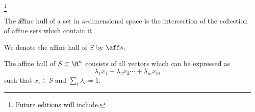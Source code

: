 
\footnote{Future editions will include.}


The \t{affine hull} of a set in $n$-dimensional space is the intersection of the collection of affine sets which contain it.


We denote the affine hull of $S$ by $\aff s$.

\begin{prop}
  The affine hull of $S \subset \R^n$ consists of all vectors which can be expressed as
  \[
    \lambda_1 x_1 + \lambda_2 x_2 \cdots + \lambda_m x_m
  \]
  such that $x_i \in S$ and $\sum_i \lambda_i = 1$.
\end{prop}

\blankpage
